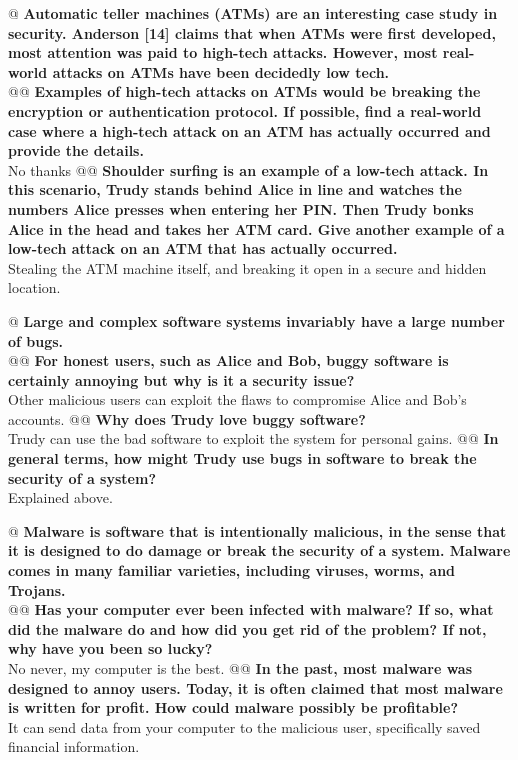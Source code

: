 \documentclass{article}
\begin{document}
\begin{easylist}
 	@ \textbf{Automatic teller machines (ATMs) are an interesting case study in security. Anderson [14] claims that when ATMs were first developed, most attention was paid to high-tech attacks. However, most real-world attacks on ATMs have been decidedly low tech.}\\
 	@@ \textbf{Examples of high-tech attacks on ATMs would be breaking the encryption or authentication protocol. If possible, find a real-world case where a high-tech attack on an ATM has actually occurred and provide the details.}\\
 		No thanks
 	@@ \textbf{Shoulder surfing is an example of a low-tech attack. In this scenario, Trudy stands behind Alice in line and watches the numbers Alice presses when entering her PIN. Then Trudy bonks Alice in the head and takes her ATM card. Give another example of a low-tech attack on an ATM that has actually occurred.}\\
 		Stealing the ATM machine itself, and breaking it open in a secure and hidden location.
 	
 	@ \textbf{Large and complex software systems invariably have a large number of bugs.}\\
 	@@ \textbf{For honest users, such as Alice and Bob, buggy software is certainly annoying but why is it a security issue?}\\
 		Other malicious users can exploit the flaws to compromise Alice and Bob's accounts.
 	@@ \textbf{Why does Trudy love buggy software?}\\
 		Trudy can use the bad software to exploit the system for personal gains.
 	@@ \textbf{In general terms, how might Trudy use bugs in software to break the security of a system?}\\
 		Explained above.
 	
 	@ \textbf{Malware is software that is intentionally malicious, in the sense that it is designed to do damage or break the security of a system. Malware comes in many familiar varieties, including viruses, worms, and Trojans.}\\
 	@@ \textbf{Has your computer ever been infected with malware? If so, what did the malware do and how did you get rid of the problem? If not, why have you been so lucky?}\\
 		No never, my computer is the best.
 	@@ \textbf{In the past, most malware was designed to annoy users. Today, it is often claimed that most malware is written for profit. How could malware possibly be profitable?}\\
 		It can send data from your computer to the malicious user, specifically saved financial information.
 	

\end{easylist}
\end{document}
